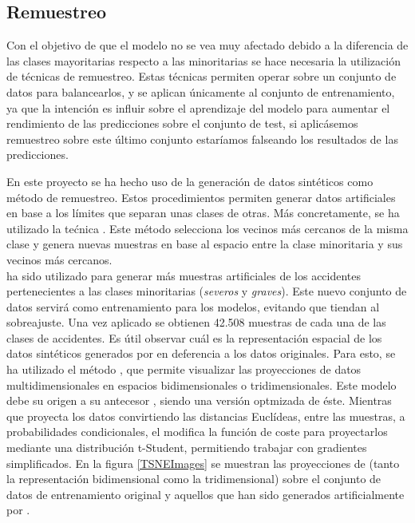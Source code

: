         \subsection{Remuestreo}


            Con el objetivo de que el modelo no se vea muy afectado debido a la diferencia de las clases mayoritarias respecto a las minoritarias se hace necesaria la utilización de técnicas de remuestreo. Estas técnicas permiten operar sobre un conjunto de datos para balancearlos, y se aplican únicamente al conjunto de entrenamiento, ya que la intención  es influir sobre el aprendizaje del modelo para aumentar el rendimiento de las predicciones sobre el conjunto de test, si aplicásemos remuestreo sobre este último conjunto estaríamos falseando los resultados de las predicciones.


            En este proyecto se ha hecho uso de la generación de datos sintéticos como método de remuestreo. Estos procedimientos permiten generar datos artificiales en base a los límites que separan unas clases de otras. Más concretamente, se ha utilizado la tećnica  \cite{SMOTEII}. Este método selecciona los vecinos más cercanos de la misma clase y genera nuevas muestras en base al espacio entre la clase minoritaria y sus vecinos más cercanos.\\

             ha sido utilizado para generar más muestras artificiales de los accidentes pertenecientes a las clases minoritarias (\textit{severos} y \textit{graves}). Este nuevo conjunto de datos servirá como entrenamiento para los modelos, evitando que tiendan al sobreajuste. Una vez aplicado  se obtienen 42.508 muestras de cada una de las clases de accidentes. Es útil observar cuál es la representación espacial de los datos sintéticos generados por  en deferencia a los datos originales. Para esto, se ha utilizado el método  \cite{TSNEPaper}, que permite visualizar las proyecciones de datos multidimensionales en espacios bidimensionales o tridimensionales. Este modelo debe su origen a su antecesor , siendo una versión optmizada de éste. Mientras que  proyecta los datos convirtiendo las distancias Euclídeas, entre las muestras, a probabilidades condicionales, el  modifica la función de coste para proyectarlos mediante una distribución t-Student, permitiendo trabajar con gradientes simplificados. En la figura \eqref{TSNEImages} se muestran las proyecciones de  (tanto la representación bidimensional como la tridimensional) sobre el conjunto de datos de entrenamiento original y aquellos que han sido generados artificialmente por .

